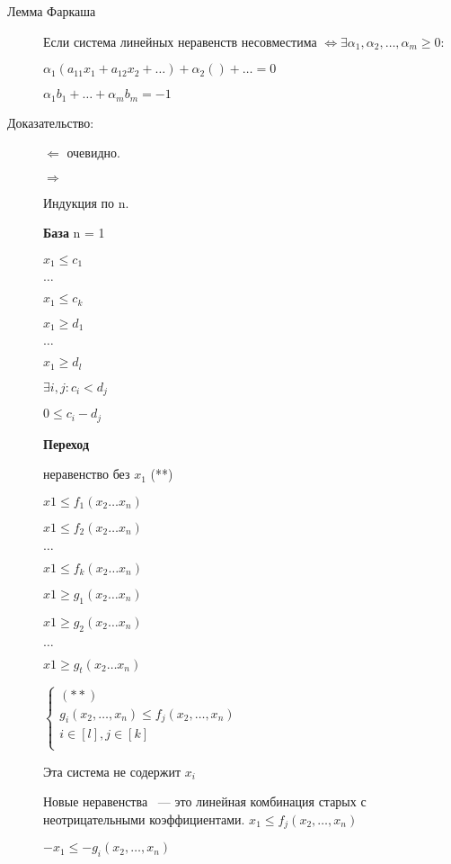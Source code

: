 \documentclass[12pt]{article}
\begin{document}
\begin{description}

\item[Лемма Фаркаша] 

Если система линейных неравенств несовместима $\Leftrightarrow \exists \alpha_1, \alpha_2, \ldots, \alpha_m \ge 0:$

$\alpha_1(a_{11}x_1 + a_{12}x_2 + \ldots) + \alpha_2() + \ldots = 0$

$\alpha_1 b_1 + \ldots + \alpha_m b_m = -1$

\item[Доказательство:]

$\Leftarrow$ очевидно. 

$\Rightarrow$ 

Индукция по n.

{\bf База} n = 1

$x_1 \le c_1$

$\ldots$

$x_1 \le c_k$

$x_1 \ge d_1$

$\ldots$

$x_1 \ge d_l$

$\exists i, j: c_i < d_j$

$0 \le c_i - d_j$

{\bf Переход}

неравенство без $x_1$ (**)

$x1 \le f_1(x_2 \ldots x_n)$

$x1 \le f_2(x_2 \ldots x_n)$

$\ldots$

$x1 \le f_k(x_2 \ldots x_n)$


$x1 \ge g_1(x_2 \ldots x_n)$

$x1 \ge g_2(x_2 \ldots x_n)$

$\ldots$

$x1 \ge g_t(x_2 \ldots x_n)$

$\begin{cases} (**) \\ g_i(x_2, \ldots, x_n) \le f_j(x_2, \ldots, x_n)\\ i \in [l], j \in [k] \\ \end{cases}$

Эта система  не содержит $x_i$

Новые неравенства ~--- это линейная комбинация старых с неотрицательными коэффициентами. 
$x_1 \le f_j(x_2, \ldots, x_n)$

$-x_1 \le -g_i(x_2, \ldots, x_n)$ 
\end{description}
\end{document}
